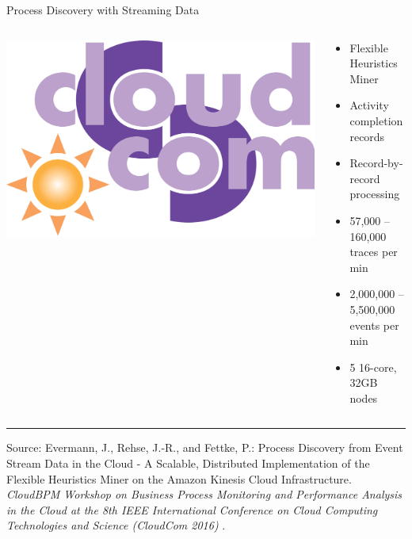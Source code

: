 \documentclass[ignorenonframetext,xcolor=x11names]{beamer}
\begin{document}
\begin{frame}{Process Discovery with Streaming Data}
\begin{columns}
\begin{column}{.3\textwidth}
\includegraphics[width=\textwidth]{cloudcom_logo.png}
\end{column}
\begin{column}{.7\textwidth}
\begin{itemize}
   \item Flexible Heuristics Miner
   \item Activity completion records
   \item Record-by-record processing
   \item 57,000 -- 160,000 traces per min
   \item 2,000,000 -- 5,500,000 events per min
   \item 5 16-core, 32GB nodes
\end{itemize}
\end{column}
\end{columns}
\vspace{\baselineskip}

\hrule

\vspace{\baselineskip}

\footnotesize
Source: Evermann, J., Rehse, J.-R., and Fettke, P.: Process Discovery from Event Stream Data in the Cloud - A Scalable, Distributed Implementation of the Flexible Heuristics Miner on the Amazon Kinesis Cloud Infrastructure. \emph{CloudBPM Workshop on Business Process Monitoring and Performance Analysis in the Cloud at the 8th IEEE International Conference on Cloud Computing Technologies and Science (CloudCom 2016)} .
\end{frame}
\end{document}
